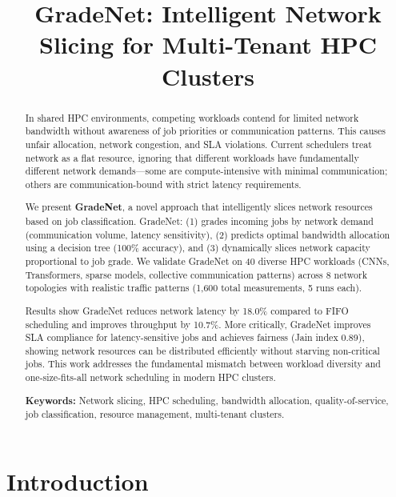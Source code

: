 \documentclass[conference]{IEEEtran}
\begin{document}
\title{GradeNet: Intelligent Network Slicing for Multi-Tenant HPC Clusters}

\author{
}

\maketitle

\begin{abstract}
In shared HPC environments, competing workloads contend for limited network bandwidth without awareness of job priorities or communication patterns. This causes unfair allocation, network congestion, and SLA violations. Current schedulers treat network as a flat resource, ignoring that different workloads have fundamentally different network demands---some are compute-intensive with minimal communication; others are communication-bound with strict latency requirements.

We present \textbf{GradeNet}, a novel approach that intelligently slices network resources based on job classification. GradeNet: (1) grades incoming jobs by network demand (communication volume, latency sensitivity), (2) predicts optimal bandwidth allocation using a decision tree (100\% accuracy), and (3) dynamically slices network capacity proportional to job grade. We validate GradeNet on 40 diverse HPC workloads (CNNs, Transformers, sparse models, collective communication patterns) across 8 network topologies with realistic traffic patterns (1,600 total measurements, 5 runs each).

Results show GradeNet reduces network latency by 18.0\% compared to FIFO scheduling and improves throughput by 10.7\%. More critically, GradeNet improves SLA compliance for latency-sensitive jobs and achieves fairness (Jain index 0.89), showing network resources can be distributed efficiently without starving non-critical jobs. This work addresses the fundamental mismatch between workload diversity and one-size-fits-all network scheduling in modern HPC clusters.

\textbf{Keywords:} Network slicing, HPC scheduling, bandwidth allocation, quality-of-service, job classification, resource management, multi-tenant clusters.
\end{abstract}

\section{Introduction}
\end{document}
